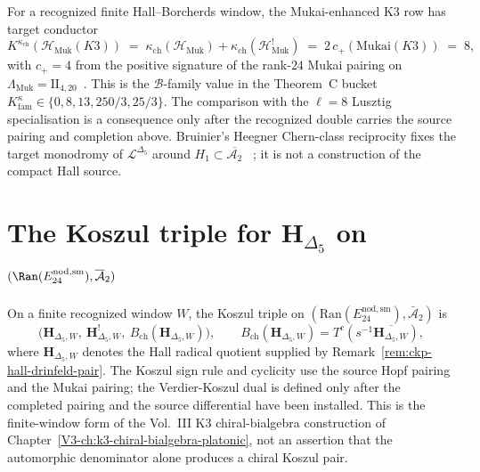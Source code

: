 \begin{remark}
\label{rem:ckp-mukai-doubling}
For a recognized finite Hall--Borcherds window, the Mukai-enhanced K3 row
has target conductor
\[
 K^{\kappa_{\mathrm{ch}}}(\mathcal{H}_{\mathrm{Muk}}(K3)) \;=\; \kappa_{\mathrm{ch}}(\mathcal{H}_{\mathrm{Muk}}) + \kappa_{\mathrm{ch}}(\mathcal{H}_{\mathrm{Muk}}^!) \;=\; 2\,c_+(\mathrm{Mukai}(K3)) \;=\; 8,
\]
with $c_+ = 4$ from the positive signature of the rank-$24$ Mukai
pairing on $\Lambda_{\mathrm{Muk}} = \mathrm{II}_{4,20}$~\cite{Mukai1987}.
This is the $\mathcal{B}$-family value in the Theorem~C bucket
$K^\kappa_{\mathrm{fam}}\in \{0, 8, 13, 250/3, 25/3\}$.  The comparison
with the $\ell=8$ Lusztig specialisation is a consequence only after the
recognized double carries the source pairing and completion above.  Bruinier's
Heegner Chern-class reciprocity fixes the target monodromy of
$\mathcal{L}^{\Delta_5}$ around $H_1\subset\overline{\mathcal A_2}$
~\cite[Proposition~5.1]{Bruinier2002}; it is not a construction of the
compact Hall source.
\end{remark}

\section{The Koszul triple for $\mathbf H_{\Delta_5}$ on
$(\Ran(E^{\mathrm{nod,sm}}_{24}),\overline{\mathcal A}_2)$}
\label{sec:ckp-deep}

\begin{remark}
\label{rem:ckp-deep-1}
On a finite recognized window $W$, the Koszul triple on
$(\mathrm{Ran}(E^{\mathrm{nod,sm}}_{24}),\bar{\mathcal A}_2)$ is
\[
\bigl(\mathbf H_{\Delta_5,W},\ \mathbf H^!_{\Delta_5,W},\
B_{\mathrm{ch}}(\mathbf H_{\Delta_5,W})\bigr),
\qquad
B_{\mathrm{ch}}(\mathbf H_{\Delta_5,W})
=T^c(s^{-1}\overline{\mathbf H_{\Delta_5,W}}),
\]
where $\mathbf H_{\Delta_5,W}$ denotes the Hall radical quotient supplied
by Remark~\ref{rem:ckp-hall-drinfeld-pair}.  The Koszul sign rule and
cyclicity use the source Hopf pairing and the Mukai pairing; the
Verdier-Koszul dual is defined only after the completed pairing and the
source differential have been installed.  This is the finite-window form
of the Vol.~III K3 chiral-bialgebra construction of
Chapter~\ref{V3-ch:k3-chiral-bialgebra-platonic}, not an assertion that
the automorphic denominator alone produces a chiral Koszul pair.
\end{remark}

